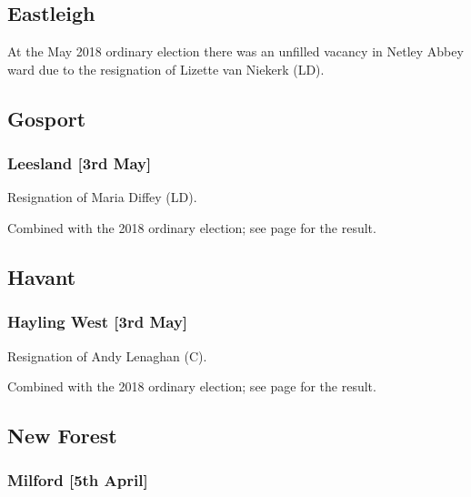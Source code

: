 \documentclass[a4paper,openany]{book}
\begin{document}
\begin{resultsiii}
\subsection*{Eastleigh}

At the May 2018 ordinary election there was an unfilled vacancy in Netley Abbey ward due to the resignation of Lizette van Niekerk (LD).

\subsection*{Gosport}

\subsubsection*{Leesland \hspace*{\fill}\nolinebreak[1]%
\enspace\hspace*{\fill}
[3rd May]}


Resignation of Maria Diffey (LD).

Combined with the 2018 ordinary election; see page \pageref{LeeslandGosport} for the result.

\subsection*{Havant}

\subsubsection*{Hayling West \hspace*{\fill}\nolinebreak[1]%
\enspace\hspace*{\fill}
[3rd May]}


Resignation of Andy Lenaghan (C).

Combined with the 2018 ordinary election; see page \pageref{HaylingWestHavant} for the result.

\subsection*{New Forest}

\subsubsection*{Milford \hspace*{\fill}\nolinebreak[1]%
\enspace\hspace*{\fill}
[5th April]}


\end{resultsiii}
\end{document}
